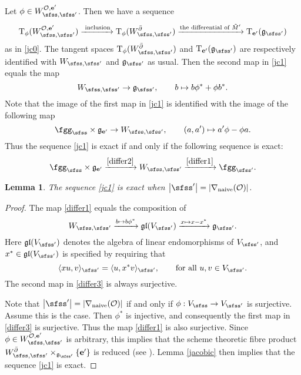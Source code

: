 \documentclass[12pt,a4paper]{amsart}
\def\abs#1{\left|{#1}\right|}
\newcommand{\CO}{{\mathcal {O}}}
\newcommand{\g}{\mathfrak g}
\newcommand{\la}{\langle}
\newcommand{\ra}{\rangle}
\newcommand{\be}{\begin {equation}}
\newcommand{\ee}{\end {equation}}
\numberwithin{equation}{section}
\newtheorem{lem}[thm]{Lemma}
\theoremstyle{remark}
\begin{document}
Let $\phi\in W_{\sfss, \sfss'}^{\CO, \mathbf e'}$. Then we have a sequence
\be\label{jc1}
    \mathrm T_\phi (W_{\sfss, \sfss'}^{\CO, \mathbf e'})\xrightarrow{\textrm{ inclusion}} \mathrm T_\phi(W_{\sfss, \sfss'}^{\bar \partial})\xrightarrow{\textrm{the differential of $\tilde M'$}} \mathrm T_{\mathbf e'}(\g_{\sfss'})
\ee
as in \eqref{jc0}.
The tangent spaces $\mathrm T_\phi(W_{\sfss, \sfss'}^{\bar \partial})$ and $\mathrm T_{\mathbf e'}(\g_{\sfss'})$ are respectively identified with $W_{\sfss, \sfss'}$ and $\g_{\sfss'}$ as usual. Then the second map in \eqref{jc1} equals the map
\be\label{differ1}
  W_{\sfss, \sfss'}\rightarrow \g_{\sfss'}, \qquad b\mapsto b\ww^{*}+\ww b^{*} .
\ee
Note that the  image of the first map in \eqref{jc1} is identified with the image of the following map
\be\label{differ2}
 \fggs\times  \g_{\mathbf e'} \rightarrow W_{\sfss, \sfss'}, \qquad (a,a')\mapsto a'\ww - \ww a.
\ee
Thus the sequence \eqref{jc1} is exact if and only if the following sequence is exact:
\begin{equation}\label{eq:CGG}
  \fggs\times  \g_{\mathbf e'} \xrightarrow{\eqref{differ2} } W_{\sfss, \sfss'}
  \xrightarrow{\eqref{differ1}} \fggsp.
\end{equation}




\begin{lem}\label{lemexact1}
The sequence \eqref{jc1} is exact when $\abs{\sfss'}=\abs{\nabla_{\mathrm{naive}}(\CO)}$.
\end{lem}
\begin{proof}
The map \eqref{differ1} equals the composition of
\be\label{differ3}
  W_{\sfss, \sfss'}\xrightarrow{b\mapsto b\phi^*} \g\mathfrak l(V_{\sfss'})\xrightarrow{x\mapsto x-x^*} \g_{\sfss'}.
\ee
Here $ \g\mathfrak l(V_{\sfss'})$ denotes the algebra of  linear endomorphisms of $V_{\sfss'}$, and $x^*\in  \g\mathfrak l(V_{\sfss'})$ is specified by requiring that
\be\label{ajoint4}
  \la x u, v\ra_{\sfss'}=\la u, x^* v\ra_{\sfss'},\qquad \textrm{for all }u,v\in V_{\sfss'}.
\ee
The second map in \eqref{differ3} is always surjective.

Note that $\abs{\sfss'}=\abs{\nabla_{\mathrm{naive}}(\CO)}$ if and only if  $\phi: V_{\sfss}\rightarrow V_{\sfss'}$ is surjective. Assume this is the case. Then $\phi^*$ is injective, and consequently the first map in  \eqref{differ3}  is  surjective. Thus the map \eqref{differ1} is also surjective. Since $\phi\in W_{\sfss, \sfss'}^{\CO, \mathbf e'}$ is arbitrary, this implies that the scheme theoretic  fibre product
$W_{\sfss, \sfss'}^{\bar \partial}\times_{\g_{\sfss'}}\{\mathbf e'\}$ is reduced (see \cite[Proposition~10.4]{HS}). Lemma \ref{jacobic} then implies that the sequence \eqref{jc1} is exact.


\end{proof}
\end{document}
